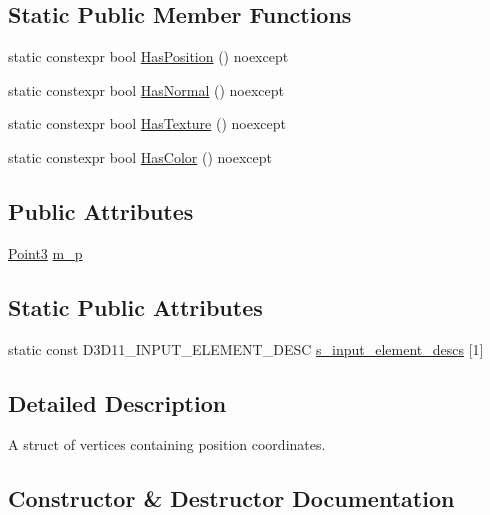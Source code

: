 \subsection*{Static Public Member Functions}
\begin{DoxyCompactItemize}
\item 
static constexpr bool \mbox{\hyperlink{structmage_1_1rendering_1_1_vertex_position_a23134a6f43a36f72f94ec6dba3024503}{Has\+Position}} () noexcept
\item 
static constexpr bool \mbox{\hyperlink{structmage_1_1rendering_1_1_vertex_position_abf33917c1c93dfcffd25c146b53189e8}{Has\+Normal}} () noexcept
\item 
static constexpr bool \mbox{\hyperlink{structmage_1_1rendering_1_1_vertex_position_aac518715cc922a0094261f075f8ae80b}{Has\+Texture}} () noexcept
\item 
static constexpr bool \mbox{\hyperlink{structmage_1_1rendering_1_1_vertex_position_afe87ed5fda84b4acc17a94a07d389ff7}{Has\+Color}} () noexcept
\end{DoxyCompactItemize}
\subsection*{Public Attributes}
\begin{DoxyCompactItemize}
\item 
\mbox{\hyperlink{structmage_1_1_point3}{Point3}} \mbox{\hyperlink{structmage_1_1rendering_1_1_vertex_position_a49602fa786c64fb0fca47a0a0992f779}{m\+\_\+p}}
\end{DoxyCompactItemize}
\subsection*{Static Public Attributes}
\begin{DoxyCompactItemize}
\item 
static const D3\+D11\+\_\+\+I\+N\+P\+U\+T\+\_\+\+E\+L\+E\+M\+E\+N\+T\+\_\+\+D\+E\+SC \mbox{\hyperlink{structmage_1_1rendering_1_1_vertex_position_a094b822673f010526197174900dd4349}{s\+\_\+input\+\_\+element\+\_\+descs}} \mbox{[}1\mbox{]}
\end{DoxyCompactItemize}


\subsection{Detailed Description}
A struct of vertices containing position coordinates. 

\subsection{Constructor \& Destructor Documentation}
\mbox{\label{structmage_1_1rendering_1_1_vertex_position_a9df4fa391d76a89997e8b512fc3142d2}} 
